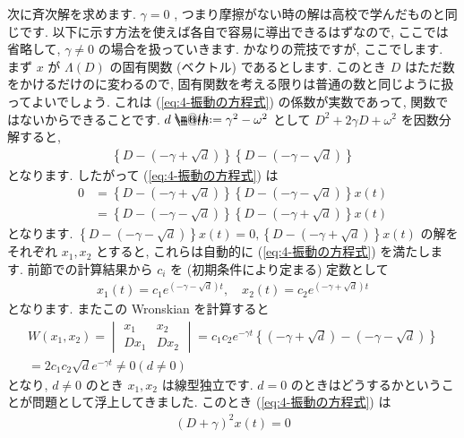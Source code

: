 \documentclass[openany, a4paper, oneside]{jsbook}
\makeatletter
\newcommand*{\defeq}{\mathrel{\rlap{%
\raisebox{0.3ex}{$\m@th\cdot$}}%
\raisebox{-0.3ex}{$\m@th\cdot$}}%
=}
\theoremstyle{break}
\theoremstyle{breakdefn}
\makeatother
\begin{document}
次に斉次解を求めます.
$\gamma = 0$ , つまり摩擦がない時の解は高校で学んだものと同じです.
以下に示す方法を使えば各自で容易に導出できるはずなので,
ここでは省略して,  $\gamma \not= 0$ の場合を扱っていきます.
かなりの荒技ですが, ここでします.
まず $x$ が $\Lambda (D)$ の固有関数 (ベクトル) であるとします.
このとき $D$ はただ数をかけるだけのに変わるので,
固有関数を考える限りは普通の数と同じように扱ってよいでしょう.
これは (\ref{eq:4-振動の方程式}) の係数が実数であって, 関数ではないからできることです.
$d \defeq \gamma ^2 - \omega ^2$ として $D^2 + 2 \gamma D + \omega ^2$ を因数分解すると,
\begin{gather}
\left \{ D - ( - \gamma + \sqrt{d} ) \right \} \left \{ D - ( - \gamma - \sqrt{d} ) \right \}
\end{gather}
となります.
したがって (\ref{eq:4-振動の方程式}) は
\begin{align}
0
&=
\left \{ D - ( - \gamma + \sqrt{d} ) \right \} \left \{ D - ( - \gamma - \sqrt{d} ) \right \} x (t) \\
&=
\left \{ D - ( - \gamma - \sqrt{d} ) \right \} \left \{ D - ( - \gamma + \sqrt{d} ) \right \} x (t)
\end{align}
となります.
$\left \{ D - ( - \gamma - \sqrt{d} ) \right \} x (t)=0,
\left \{ D - ( - \gamma + \sqrt{d} ) \right \} x (t)$
の解をそれぞれ $x_1 , x_2$ とすると, これらは自動的に (\ref{eq:4-振動の方程式}) を満たします.
前節での計算結果から $c_i$ を (初期条件により定まる) 定数として
\begin{gather}
x_1 (t)
=
c_1 e^{ ( - \gamma - \sqrt{d} ) t}
, \quad
x_2 (t)
=
c_2 e^{ ( -\gamma + \sqrt{d} ) t}
\end{gather}
となります.
またこの Wronskian を計算すると
\begin{gather}
W (x_1 ,x_2)
=
\begin{vmatrix}
x_1 & x_2 \\
D x_1 & D x_2
\end{vmatrix}
=
c_1 c_2 e^{- \gamma t} \left \{ ( -\gamma + \sqrt{d} ) - ( - \gamma - \sqrt{d} ) \right \}  \\
=
2 c_1 c_2 \sqrt{d} e^{- \gamma t}
\not=
0 ( d \not= 0)
\end{gather}
となり,  $d \not= 0$ のとき $x_1,x_2$ は線型独立です.
$d=0$ のときはどうするかということが問題として浮上してきました.
このとき (\ref{eq:4-振動の方程式}) は
\begin{gather}
( D + \gamma ) ^2 x (t) =0
\end{gather}
\end{document}
